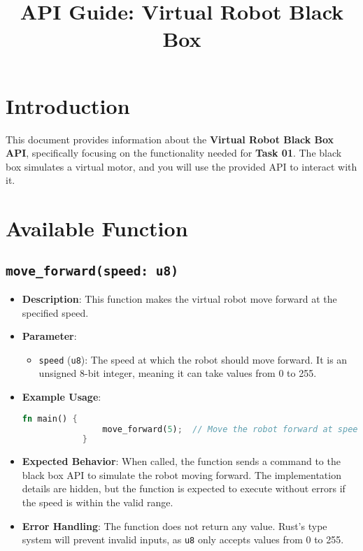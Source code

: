 \documentclass[12pt]{article}
\title{API Guide: Virtual Robot Black Box}
\author{}
\date{}
\begin{document}
	
	\maketitle
	
	\section*{Introduction}
	This document provides information about the \textbf{Virtual Robot Black Box API}, specifically focusing on the functionality needed for \textbf{Task 01}. The black box simulates a virtual motor, and you will use the provided API to interact with it.
	
	\section*{Available Function}
	
	\subsection*{\texttt{move\_forward(speed: u8)}}
	\begin{itemize}
		\item \textbf{Description}: 
		This function makes the virtual robot move forward at the specified speed.
		\item \textbf{Parameter}: 
		\begin{itemize}
			\item \texttt{speed} (\texttt{u8}): 
			The speed at which the robot should move forward. It is an unsigned 8-bit integer, meaning it can take values from 0 to 255.
		\end{itemize}
		\item \textbf{Example Usage}:
		\begin{lstlisting}[language=Rust, caption={Using the move\_forward function}]
			fn main() {
				move_forward(5);  // Move the robot forward at speed 5
			}
		\end{lstlisting}
		\item \textbf{Expected Behavior}:
		When called, the function sends a command to the black box API to simulate the robot moving forward. The implementation details are hidden, but the function is expected to execute without errors if the speed is within the valid range.
		\item \textbf{Error Handling}:
		The function does not return any value. Rust's type system will prevent invalid inputs, as \texttt{u8} only accepts values from 0 to 255.
	\end{itemize}
	
\end{document}
